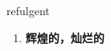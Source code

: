 
\begin{frame}
{\huge refulgent}
\begin{center}
\begin{enumerate}\Large
  \item \textbf{辉煌的，灿烂的}
\end{enumerate}
\end{center}
\end{frame}
